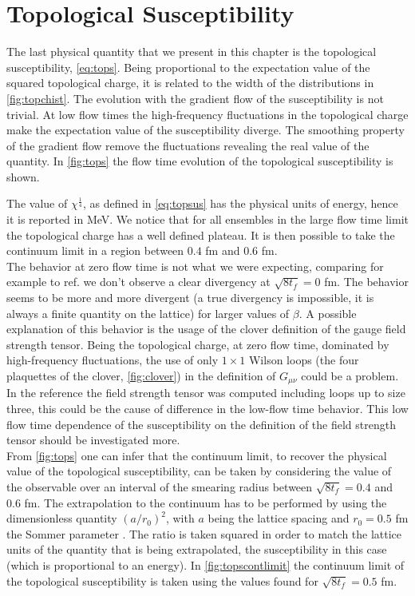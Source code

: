 \section{Topological Susceptibility}
The last physical quantity that we present in this chapter is the topological susceptibility, \cref{eq:tops}. Being proportional to the expectation value of the squared topological charge, it is related to the width of the distributions in \cref{fig:topchist}. The evolution with the gradient flow of the susceptibility is not trivial. At low flow times the high-frequency fluctuations in the topological charge make the expectation value of the susceptibility diverge. The smoothing property of the gradient flow remove the fluctuations revealing the real value of the quantity. In \cref{fig:tops} the flow time evolution of the topological susceptibility is shown.
 
The value of $\chi^{\frac{1}{4}}$, as defined in \cref{eq:topsus} has the physical units of energy, hence it is reported in MeV. We notice that for all ensembles in the large flow time limit the topological charge has a well defined plateau. It is then possible to take the continuum limit in a region between $0.4$ fm and $0.6$ fm. \\
The behavior at zero flow time is not what we were expecting, comparing for example to ref. \cite{shindler_nucleon_2015} we don't observe a clear divergency at $\sqrt{8t_f} = 0$ fm. The behavior seems to be more and more divergent (a true divergency is impossible, it is always a finite quantity on the lattice) for larger values of $\beta$. A possible explanation of this behavior is the usage of the clover definition of the gauge field strength tensor. Being the topological charge, at zero flow time, dominated by high-frequency fluctuations, the use of only $1\times1$ Wilson loops (the four plaquettes of the clover, \cref{fig:clover}) in the definition of $G_{\mu\nu}$ could be a problem. In the reference the field strength tensor was computed including loops up to size three, this could be the cause of difference in the low-flow time behavior. This low flow time dependence of the susceptibility on the definition of the field strength tensor should be investigated more. \\
From \cref{fig:tops} one can infer that the continuum limit, to recover the physical value of the topological susceptibility, can be taken by considering the value of the observable over an interval of the smearing radius between  $\sqrt{8t_f} = 0.4$ and $0.6$ fm. The extrapolation to the continuum has to be performed by using the dimensionless quantity $(a/r_0)^2$, with $a$ being the lattice spacing and $r_0 = 0.5$ fm the Sommer parameter \cite{guagnelli_precision_1998}. The ratio is taken squared in order to match the lattice units of the quantity that is being extrapolated, the susceptibility in this case (which is proportional to an energy). In \cref{fig:topscontlimit} the continuum limit of the topological susceptibility is taken using the values found for $\sqrt{8t_f}=0.5$ fm.   

